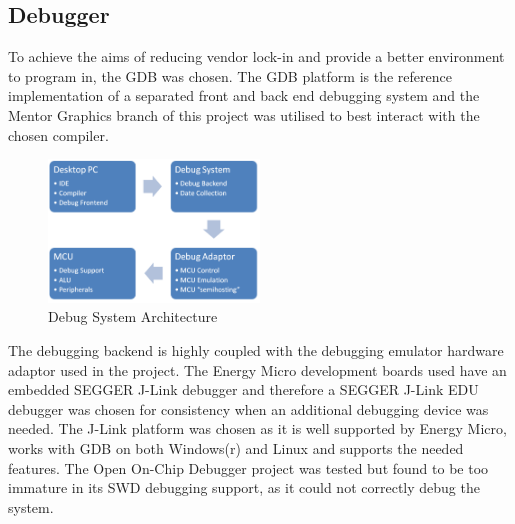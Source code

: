\subsection{Debugger}
To achieve the aims of reducing vendor lock-in and provide a better environment to program in, the
\ac{GDB} was chosen. The \ac{GDB} platform is the reference implementation of a
separated front and back end debugging system and the Mentor Graphics branch of this project was
utilised to best interact with the chosen compiler.

\begin{figure}
  \vspace{-10pt}
  \begin{center}
    \includegraphics[width=0.5\textwidth, keepaspectratio=true]{images/debug_system.png}
  \end{center}
  \caption[Debug System Architecture]{Debug System Architecture}
  \vspace{-10pt}
\end{figure}

The debugging backend is highly coupled with the debugging emulator hardware adaptor used in the
project. The Energy Micro development boards used have an embedded SEGGER J-Link debugger
and therefore a SEGGER J-Link EDU debugger was chosen for consistency when an additional
debugging device was needed. The J-Link platform was chosen as it is well supported by Energy
Micro, works with GDB on both Windows(r) and Linux and supports the needed features. The Open
On-Chip Debugger project was tested but found to be too immature in its SWD debugging support,
as it could not correctly debug the system.


